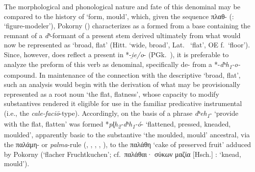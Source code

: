 \documentclass[output=paper,colorlinks,citecolor=brown]{langscibook}
\begin{document}
The morphological and phonological nature and fate of this denominal  may be compared to the history of  ‘form, mould’, which, given the sequence πλαθ{}- (:  ‘figure-modeler’), Pokorny () characterizes as a  formed from a base containing the remnant of a \textit{dʰ}-formant of a present stem derived ultimately from what would now be represented as  ‘broad, flat’ (Hitt.  ‘wide, broad’, Lat.\  ‘flat’, OE  f.\ ‘floor’). Since, however,  does reflect a present in *-\textit{i̯e/o}-  (PGk.\ \mbox{),} it is preferable to analyze the preform of this verb as denominal, specifically de- from a *-\textit{dʰh\textsubscript{1}-o-}  compound. In maintenance of the connection with the descriptive  ‘broad, flat’, such an analysis would begin with the derivation of what may be provisionally represented as a root noun  ‘the flat, flatness’, whose capacity to modify substantives rendered it eligible for use in the familiar predicative instrumental  (i.e., the \textit{cale-faciō}-type). Accordingly, on the basis of a  phrase   \textit{dʰeh\textsubscript{1}}- ‘provide with the flat, flatten’ was formed   *\textit{pl̥h\textsubscript{2}-dʰh\textsubscript{1}-ó}- ‘flattened, pressed, kneaded, moulded’, apparently basic to the substantive  ‘the moulded, mould’ ancestral, via the παλάμη- or \textit{palma}-rule (\citealt[157--158]{Rix1996}, \citealt[108--109]{Meiser1998}, \citealt{Hofler2017}, \citealt[119]{Weiss2020}, \citealt[193--194]{Hackstein2021}), to the παλάθη ‘cake of preserved fruit’ adduced by Pokorny (‘flacher Fruchtkuchen’; cf.\ παλάθαι· σύκων μαζία [Hsch.] :  ‘knead, mould’). 
\end{document}
